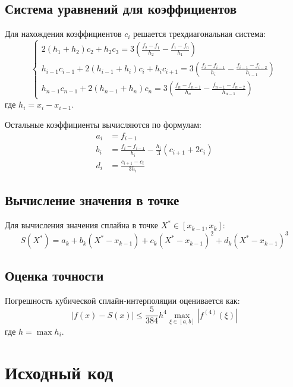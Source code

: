 \subsection*{Система уравнений для коэффициентов}
Для нахождения коэффициентов $c_i$ решается трехдиагональная система:
\[
\begin{cases}
    2(h_1 + h_2)c_2 + h_2c_3 = 3\left(\frac{f_2-f_1}{h_2} - \frac{f_1-f_0}{h_1}\right) \\
    h_{i-1}c_{i-1} + 2(h_{i-1}+h_i)c_i + h_i c_{i+1} = 3\left(\frac{f_i-f_{i-1}}{h_i} - \frac{f_{i-1}-f_{i-2}}{h_{i-1}}\right) \\
    h_{n-1}c_{n-1} + 2(h_{n-1}+h_n)c_n = 3\left(\frac{f_n-f_{n-1}}{h_n} - \frac{f_{n-1}-f_{n-2}}{h_{n-1}}\right)
\end{cases}
\]
где $h_i = x_i - x_{i-1}$.

Остальные коэффициенты вычисляются по формулам:
\[
\begin{aligned}
    a_i &= f_{i-1} \\
    b_i &= \frac{f_i - f_{i-1}}{h_i} - \frac{h_i}{3}(c_{i+1} + 2c_i) \\
    d_i &= \frac{c_{i+1} - c_i}{3h_i}
\end{aligned}
\]

\subsection*{Вычисление значения в точке}
Для вычисления значения сплайна в точке $X^* \in [x_{k-1}, x_k]$:
\[ S(X^*) = a_k + b_k(X^*-x_{k-1}) + c_k(X^*-x_{k-1})^2 + d_k(X^*-x_{k-1})^3 \]

\subsection*{Оценка точности}
Погрешность кубической сплайн-интерполяции оценивается как:
\[ |f(x) - S(x)| \leq \frac{5}{384}h^4 \max_{\xi\in[a,b]} |f^{(4)}(\xi)| \]
где $h = \max h_i$.

\section*{Исходный код}

